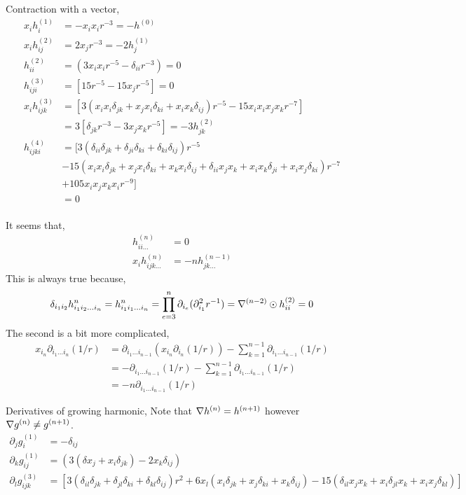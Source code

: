 \documentclass[12pt]{My_preprint}
\newcommand{\ii}{\delta}
\begin{document}
Contraction with a vector, 
\begin{align*}
    x_i h^{(1)}_{i} &= -x_ix_i r^{-3} = - h^{(0)}\\
    x_i h^{(2)}_{ij} &= 2  x_j r^{-3} = -2 h^{(1)}_j \\
    h^{(2)}_{ii} &= (3 x_i x_i r^{-5} - \ii_{ii} r^{-3}) = 0 \\
    h^{(3)}_{iji} &= [15 r^{-5} - 15 x_j r^{-5}] = 0\\
    x_i h^{(3)}_{ijk} &= [3 (x_i x_i \ii_{jk} + x_j x_i \ii_{ki} +x_i  x_k \ii_{ij})r^{-5} - 15 x_i x_ix_jx_k r^{-7}]\\
     &= 3 [ \ii_{jk}r^{-3} - 3 x_jx_k r^{-5}] = - 3 h_{jk}^{(2)} \\
     h^{(4)}_{ijki} &= [
    3 (\ii_{ii} \ii_{jk} + \ii_{ji} \ii_{ki} + \ii_{ki} \ii_{ij})r^{-5} \\
    &- 15 (x_ix_i  \ii_{jk} + x_jx_i  \ii_{ki} + x_k x_i \ii_{ij} + \ii_{ii}x_jx_k+ x_i x_k\ii_{ji}+x_ix_j\ii_{ki}) r^{-7}\\
    &+ 105  x_ix_jx_kx_i r^{-9}
    ] \\
     &= 0 \\
\end{align*}

It seems that, 
\begin{align*}
    h_{ii\ldots}^{(n)} &= 0\\
    x_i h_{ijk\ldots }^{(n)} &= -n h_{jk\ldots }^{(n-1)}  
\end{align*}
This is always true because, 
\begin{equation}
    \delta_{i_1 i_2} h^{n}_{i_1i_2\ldots i_n}
    =
    h^{n}_{i_1i_1\ldots i_n}
    =
    \prod_{e=3}^{n}
    \partial_{i_e}(
    \partial_{i_1}^2
    r^{-1})
    = \mathbf{\nabla}^{(n-2)}
    \odot 
    h_{ii}^{(2)}
    = 0 
\end{equation}
The second is a bit more complicated, 
\begin{align}
    x_{i_n} \partial_{i_1\ldots i_n} (1/r)
    &=
    \partial_{i_1\ldots i_{n-1}}  (x_{i_n} \partial_{i_n} (1/r))
    - 
    \sum_{k=1}^{n-1}
    \partial_{i_1\ldots i_{n-1}}  (1/r)\\
    &= 
    - \partial_{i_1\ldots i_{n-1}}  (1/r)
    - 
    \sum_{k=1}^{n-1}
    \partial_{i_1\ldots i_{n-1}}  (1/r)\\
    &= -n 
    \partial_{i_1\ldots i_{n-1}}  (1/r)
\end{align}

Derivatives of growing harmonic, 
Note that $\mathbf{\nabla} h^{(n)} = h^{(n+1)}$ however $\mathbf{\nabla} g^{(n)} \neq g^{(n+1)}$. 
\begin{align*}
    \partial_j g^{(1)}_i
    &=
    - \ii_{ij}\\
    \partial_k g^{(1)}_{ij}
    &=
    (3 (\ii x_j+x_i \ii_{jk}) - 2 x_k \ii_{ij})\\
    \partial_l g^{(3)}_{ijk} 
    &= [
        3 (\ii_{il} \ii_{jk} + \ii_{jl} \ii_{ki} + \ii_{kl} \ii_{ij})r^2 
        + 6 x_l (x_i \ii_{jk} + x_j \ii_{ki} + x_k \ii_{ij})
    - 15 (\ii_{il}x_jx_k+x_i\ii_{jl}x_k+x_ix_j\ii_{kl}) ]\\
\end{align*}
\end{document}
